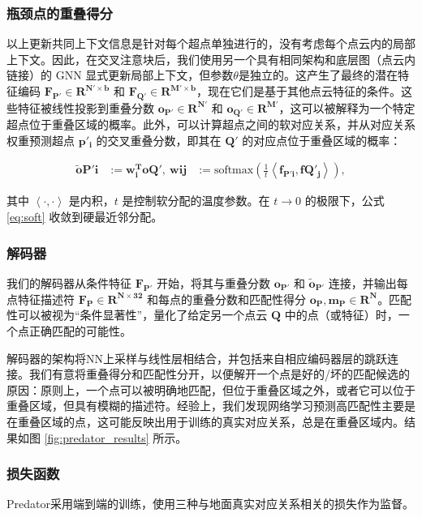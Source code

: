\subsubsection{瓶颈点的重叠得分}
以上更新共同上下文信息是针对每个超点单独进行的，没有考虑每个点云内的局部上下文。因此，在交叉注意块后，我们使用另一个具有相同架构和底层图（点云内链接）的 GNN 显式更新局部上下文，但参数$\theta$是独立的。这产生了最终的潜在特征编码 $\boldsymbol{F_{P'} \in R^{N' \times b}}$ 和 $\boldsymbol{F_{Q'} \in R^{M' \times b}}$，现在它们是基于其他点云特征的条件。这些特征被线性投影到重叠分数 $\boldsymbol{o_{P'} \in R^{N'}}$ 和 $\boldsymbol{o_{Q'} \in R^{M'}}$，这可以被解释为一个特定超点位于重叠区域的概率。此外，可以计算超点之间的软对应关系，并从对应关系权重预测超点 $\boldsymbol{p'_i}$ 的交叉重叠分数，即其在 $\boldsymbol{Q'}$ 的对应点位于重叠区域的概率：

\begin{equation}
\begin{aligned}
    \label{eq:soft}
\boldsymbol{\tilde{o}{P'i}} & := \boldsymbol{w_i^T o{Q'}}, \
\boldsymbol{w{ij}} & := \text{softmax} \left( \frac{1}{t} \left<\boldsymbol{f_{P'i}}, \boldsymbol{f{Q'_j}}\right> \right),
\end{aligned}
\end{equation}

其中 $\left<\cdot, \cdot\right>$ 是内积，$t$ 是控制软分配的温度参数。在 $t \rightarrow 0$ 的极限下，公式 \ref{eq:soft} 收敛到硬最近邻分配。

\subsubsection{解码器}
我们的解码器从条件特征 $\boldsymbol{F_{P'}}$ 开始，将其与重叠分数 $\boldsymbol{o_{P'}}$ 和 $\boldsymbol{\tilde{o}_{P'}}$ 连接，并输出每点特征描述符 $\boldsymbol{F_P \in R^{N \times 32}}$ 和每点的重叠分数和匹配性得分 $\boldsymbol{o_P, m_P \in R^N}$。匹配性可以被视为“条件显著性”，量化了给定另一个点云 $\boldsymbol{Q}$ 中的点（或特征）时，一个点正确匹配的可能性。

解码器的架构将NN上采样与线性层相结合，并包括来自相应编码器层的跳跃连接。我们有意将重叠得分和匹配性分开，以便解开一个点是好的/坏的匹配候选的原因：原则上，一个点可以被明确地匹配，但位于重叠区域之外，或者它可以位于重叠区域，但具有模糊的描述符。经验上，我们发现网络学习预测高匹配性主要是在重叠区域的点，这可能反映出用于训练的真实对应关系，总是在重叠区域内。结果如图 \ref{fig:predator_results} 所示。

\subsubsection{损失函数}
Predator采用端到端的训练，使用三种与地面真实对应关系相关的损失作为监督。

